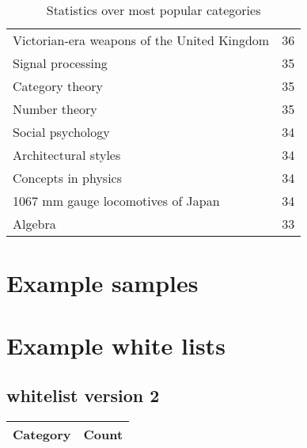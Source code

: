 \begin{appendices}
\begin{table}[h!]
\begin{tabular} {|| p{20em} | p{5em} ||}
Victorian-era weapons of the United Kingdom & 36 \\
Signal processing & 35 \\
Category theory & 35 \\
Number theory & 35 \\
Social psychology & 34 \\
Architectural styles & 34 \\
Concepts in physics & 34 \\
1067 mm gauge locomotives of Japan & 34 \\
Algebra & 33 \\
 \hline
\end{tabular}
\caption{Statistics over most popular categories}
\label{table:A.1}
\end{table}

\chapter{Example samples}




\chapter{Example white lists} \label{app_whitelist}

\section{whitelist version 2}

\centering
\begin{longtable} {|| p{20em} | p{5em} ||} 
 \hline
 Category & Count \\ [0.5ex] 
 \hline
 

\end{longtable}
\end{appendices}
